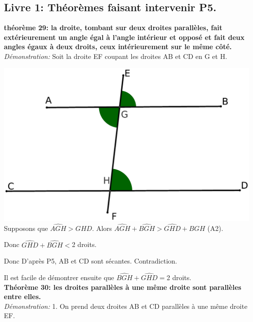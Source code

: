 \documentclass[a4paper, 12pt, twoside]{book}
\begin{document}
 
 
  \subsection{Livre 1: Théorèmes faisant intervenir P5.}
 
  \textbf{théorème 29: la droite, tombant sur deux droites parallèles, fait extérieurement un angle égal à l'angle intérieur et opposé et fait deux angles égaux à deux droits, ceux intérieurement sur le même côté.}\\
  
  \textit{Démonstration:} Soit la droite EF coupant les droites AB et CD en G et H.
 
  \includegraphics[scale=0.2]{figures/th29.eps} \\
  
  
 Supposons que $\hat{AGH}>\hat{GHD}$. Alors  $\hat{AGH}+\hat{BGH}>\hat{GHD}+\hat{BGH}$ (A2).\
 
 Donc $\hat{GHD}+\hat{BGH}<$2 droits.\
 
 Donc D'après P5, AB et CD sont sécantes. Contradiction.\
 
 Il est facile de démontrer ensuite que  $\hat{BGH}+\hat{GHD}=$2 droits.\\
 
 \textbf{Théorème 30: les droites parallèles à une même droite sont parallèles entre elles.}\\
 
 \textit{ Démonstration:} 
1. On prend deux droites AB et CD parallèles à une même droite EF.\\ 
\end{document}
